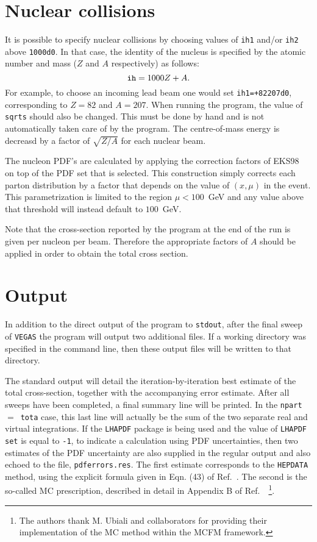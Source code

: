 \documentclass[12pt]{article}
\begin{document}
\section{Nuclear collisions}
\label{sec:nucleus}

It is possible to specify nuclear collisions by choosing values
of {\tt ih1} and/or {\tt ih2} above {\tt 1000d0}. In that case,
the identity of the nucleus is specified by the atomic number
and mass ($Z$ and $A$ respectively) as follows:
\begin{equation}
{\tt ih} = 1000Z+A.
\end{equation}
For example, to choose an incoming lead beam one would set
{\tt ih1=+82207d0}, corresponding to $Z=82$ and $A=207$.
When running the program, the value of {\tt sqrts} should also be
changed. This must be done by hand and is not automatically taken
care of by the
program. The centre-of-mass energy is decreasd by a factor of
$\sqrt{Z/A}$ for each nuclear beam. 

The nucleon PDF's are calculated by applying the correction
factors of EKS98~\cite{Eskola:1998df} on top of the PDF set that is selected.
This construction simply corrects each parton distribution by
a factor that depends on the value of $(x,\mu)$ in the event.
This parametrization is limited to the region $\mu < 100$~GeV and
any value above that threshold will instead default to $100$~GeV.

Note that the cross-section reported by the program at the end
of the run is given per nucleon per beam. Therefore the
appropriate factors of $A$ should be applied in order to obtain
the total cross section.

\section{Output}
 
In addition to the direct output of the program to {\tt stdout}, after
the final sweep of {\tt VEGAS} the program will output two additional files.
If a working directory was specified in the command line, then these
output files will be written to that directory.

The standard output will detail the iteration-by-iteration best estimate
of the total cross-section, together with the accompanying error estimate.
After all sweeps have been completed, a final summary line will be printed.
In the {\tt npart}~$=$~{\tt tota} case, this last line will actually be the
sum of the two separate real and virtual integrations.
If the {\tt LHAPDF} package is being used and the value of
{\tt LHAPDF set} is equal to {\tt -1},  to indicate a calculation using
PDF uncertainties, then two estimates of the PDF uncertainty are
also supplied in the regular output and also echoed to the file,
{\tt pdferrors.res}. The first estimate corresponds to the
{\tt HEPDATA} method, using the explicit formula given in
Eqn. (43) of Ref.~\cite{Campbell:2006wx}. The second is the so-called
MC prescription, described in detail in Appendix B of
Ref.~\cite{Ball:2008by}~\footnote{
The authors thank M. Ubiali and collaborators for providing their
implementation of the MC method within the MCFM framework.}.
\end{document}
